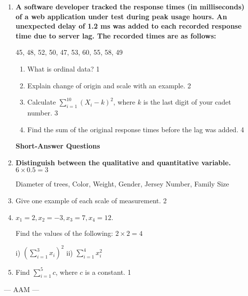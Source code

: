 \documentclass[12pt]{article}
\begin{document}
  \begin{enumerate}

  \item
\textbf{A software developer tracked the response times (in milliseconds) 
of a web application under test during peak usage hours. An unexpected 
delay of 1.2 ms was added to each recorded response time due to server
lag. The recorded times are as follows:}

\begin{center}
45, 48, 52, 50, 47, 53, 60, 55, 58, 49
\end{center}

\begin{enumerate}
    \item What is ordinal data? \hfill 1
    \item Explain change of origin and scale with an example. \hfill 2
    \item  
    Calculate $\displaystyle \sum_{i=1}^{10} (X_i - k)^2$, where $k$ is the last digit of your cadet number. \hfill 3
    \item
    Find the sum of the original response times before the lag was added. \hfill 4
\end{enumerate}

\textbf{Short-Answer Questions}

\item \textbf{Distinguish between the qualitative and quantitative variable.} \hfill $6 \times 0.5 = 3$

Diameter of trees, Color, Weight, Gender, Jersey Number, Family Size
\item Give one example of each scale of measurement. \hfill 2
    \item
	$x_1=2, x_2=-3, x_3=7, x_4=12.$ 
	
	Find the values of the following: \hfill $2 \times 2 = 4$
	
	i) $\displaystyle (\sum_{i=1}^3 x_i)^2$
	ii) $\displaystyle \sum_{i=1}^4 x_i^2$ 

\item Find $\displaystyle \sum_{i=1}^5 c$, where $c$ is a constant. \hfill 1

\end{enumerate}
\begin{center}
--- AAM ---
\end{center}
  \vspace{1cm}
  
\end{document}
